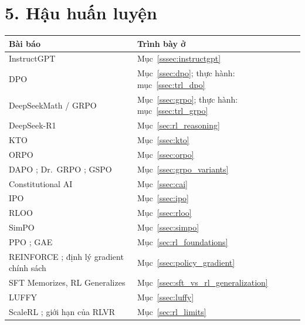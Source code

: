 \section*{5. Hậu huấn luyện}
\begin{longtable}{@{}p{7.2cm}p{7.6cm}@{}}
\toprule
\textbf{Bài báo} & \textbf{Trình bày ở} \\
\midrule
\endhead
InstructGPT \cite{ouyang2022training} & Mục~\ref{sssec:instructgpt} \\
DPO \cite{rafailov2023direct} & Mục~\ref{ssec:dpo}; thực hành: mục~\ref{ssec:trl_dpo} \\
DeepSeekMath / GRPO \cite{shao2024deepseekmath} & Mục~\ref{ssec:grpo}; thực hành: mục~\ref{ssec:trl_grpo} \\
DeepSeek-R1 \cite{deepseekai2025r1} & Mục~\ref{sec:rl_reasoning} \\
KTO \cite{ethayarajh2024kto} & Mục~\ref{ssec:kto} \\
ORPO \cite{hong2024orpo} & Mục~\ref{ssec:orpo} \\
DAPO \cite{yu2025dapo}; Dr.~GRPO \cite{liu2025drgrpo}; GSPO \cite{zheng2025gspo} & Mục~\ref{ssec:grpo_variants} \\
Constitutional AI \cite{bai2022constitutional} & Mục~\ref{ssec:cai} \\
IPO \cite{azar2024ipo} & Mục~\ref{ssec:ipo} \\
RLOO \cite{ahmadian2024rloo} & Mục~\ref{ssec:rloo} \\
SimPO \cite{meng2024simpo} & Mục~\ref{ssec:simpo} \\
PPO \cite{schulman2017proximal}; GAE \cite{schulman2016gae} & Mục~\ref{sec:rl_foundations} \\
REINFORCE \cite{williams1992reinforce}; định lý gradient chính sách \cite{sutton2000policygradient} & Mục~\ref{ssec:policy_gradient} \\
SFT Memorizes, RL Generalizes \cite{chu2025sftrl} & Mục~\ref{ssec:sft_vs_rl_generalization} \\
LUFFY \cite{yan2025luffy} & Mục~\ref{ssec:luffy} \\
ScaleRL \cite{khatri2025scalerl}; giới hạn của RLVR \cite{yue2025rlboundary} & Mục~\ref{sec:rl_limits} \\
\bottomrule
\end{longtable}

